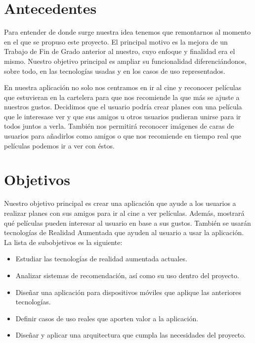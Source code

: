 
\section{Antecedentes}
\label{makereference1.1}

Para entender de donde surge nuestra idea tenemos que remontarnos al momento en el que se propuso este proyecto.
El principal motivo es la mejora de un Trabajo de Fin de Grado anterior
 al nuestro\cite{TFGRA16}, cuyo enfoque y finalidad era el mismo. Nuestro objetivo principal es 
 ampliar su funcionalidad diferenciándonos, sobre todo, en las tecnologías usadas y 
 en los casos de uso representados.

 En nuestra aplicación no solo nos centramos en ir al cine y reconocer películas que estuvieran en la cartelera
 para que nos recomiende la que más se ajuste a nuestros gustos. Decidimos que el usuario podría crear planes con
 una película que le interesase ver y que sus amigos u otros usuarios pudieran unirse para ir todos juntos a verla.
También nos permitirá reconocer imágenes de caras de usuarios para añadirlos como amigos o que nos recomiende en tiempo real
 que películas podemos ir a ver con éstos.

\section{Objetivos}
\label{makereference1.2}
Nuestro objetivo principal es crear una aplicación que ayude a los usuarios a
realizar planes con sus amigos para ir al cine a ver películas. Además,
mostrará qué películas pueden interesar al usuario en base a sus gustos.
También se usarán tecnologías de Realidad Aumentada que ayuden al usuario a usar
la aplicación.
La lista de subobjetivos es la siguiente:
\begin{itemize}  
    \item Estudiar las tecnologías de realidad aumentada actuales.
    \item Analizar sistemas de recomendación, así como su uso dentro del
     proyecto.
    \item Diseñar una aplicación para dispositivos móviles que aplique las
     anteriores tecnologías.
    \item Definir casos de uso reales que aporten valor a la aplicación.
    \item Diseñar y aplicar una arquitectura que cumpla las necesidades del
     proyecto.
\end{itemize}


